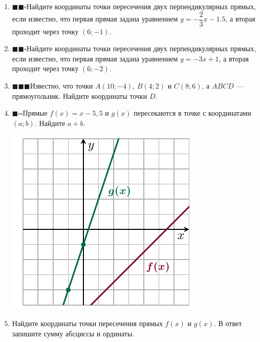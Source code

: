 \documentclass[10pt, a4paper]{article}
\newcommand{\ranswer}[1]{\textcolor{silver}{\begin{flushright}\vspace{-1em}\fbox{#1}\end{flushright}}}
\newcommand{\leveli}{\textcolor{dark}{$\blacksquare\square\square$}\hspace{0.5em}}
\newcommand{\levelii}{\textcolor{dark}{$\blacksquare\blacksquare\square$}\hspace{0.5em}}
\newcommand{\leveliii}{\textcolor{dark}{$\blacksquare\blacksquare\blacksquare$}\hspace{0.5em}}
\begin{document}
\begin{enumerate}
	\item \levelii Найдите координаты точки пересечения двух перпендикулярных прямых, если известно, что первая прямая задана уравнением $y=-\dfrac{2}{3}x-1.5$, а вторая проходит через точку $(6;-1)$. \ranswer{$(3;-3,5)$}
	\item \levelii Найдите координаты точки пересечения двух перпендикулярных прямых, если известно, что первая прямая задана уравнением $y=-3x+1$, а вторая проходит через точку $(6;-2)$. \ranswer{$(1,5;-3,5)$}
	\item \leveliii Известно, что точки $A(10;-4)$, $B(4;2)$ и $C(8;6)$, а $ABCD$ --- прямоугольник. Найдите координаты точки $D$. \ranswer{$(14;0)$}
	\item
	\begin{minipage}[t]{0.6\textwidth}
		\leveli Прямые $f(x)=x-5,5$ и $g(x)$ пересекаются в точке с координатами $(a;b)$. Найдите $a+b$. \ranswer{$-10$}
	\end{minipage}
	\begin{minipage}[t]{0.3\textwidth}
		\includegraphics[align=t, width=\textwidth]{../graphs/graph_6/graph_6}
	\end{minipage}
	\item
	\begin{minipage}[t]{0.6\textwidth}
		Найдите координаты точки пересечения прямых $f(x)$ и $g(x)$. В ответ запишите сумму абсциссы и ординаты. \ranswer{$3,75$}

\end{minipage}
\end{enumerate}
\end{document}
